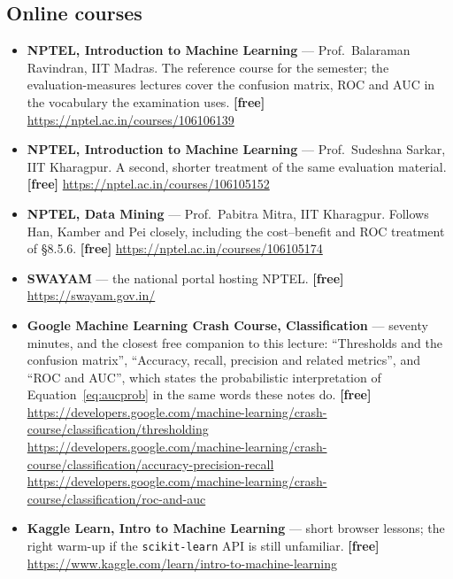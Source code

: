 \documentclass[11pt]{article}
\begin{document}
\subsection*{Online courses}

\begin{sloppypar}
\begin{itemize}[leftmargin=*]
  \item \textbf{NPTEL, Introduction to Machine Learning} --- Prof.\ Balaraman
    Ravindran, IIT Madras. The reference course for the semester; the
    evaluation-measures lectures cover the confusion matrix, ROC and AUC in the
    vocabulary the examination uses. \textbf{[free]}
    \url{https://nptel.ac.in/courses/106106139}
  \item \textbf{NPTEL, Introduction to Machine Learning} --- Prof.\ Sudeshna
    Sarkar, IIT Kharagpur. A second, shorter treatment of the same evaluation
    material. \textbf{[free]} \url{https://nptel.ac.in/courses/106105152}
  \item \textbf{NPTEL, Data Mining} --- Prof.\ Pabitra Mitra, IIT Kharagpur.
    Follows Han, Kamber and Pei closely, including the cost--benefit and ROC
    treatment of \S8.5.6. \textbf{[free]}
    \url{https://nptel.ac.in/courses/106105174}
  \item \textbf{SWAYAM} --- the national portal hosting NPTEL. \textbf{[free]}
    \url{https://swayam.gov.in/}
  \item \textbf{Google Machine Learning Crash Course, Classification} ---
    seventy minutes, and the closest free companion to this lecture:
    ``Thresholds and the confusion matrix'', ``Accuracy, recall, precision and
    related metrics'', and ``ROC and AUC'', which states the probabilistic
    interpretation of Equation~\eqref{eq:aucprob} in the same words these notes
    do. \textbf{[free]}
    \url{https://developers.google.com/machine-learning/crash-course/classification/thresholding}
    \\
    \url{https://developers.google.com/machine-learning/crash-course/classification/accuracy-precision-recall}
    \\
    \url{https://developers.google.com/machine-learning/crash-course/classification/roc-and-auc}
  \item \textbf{Kaggle Learn, Intro to Machine Learning} --- short browser
    lessons; the right warm-up if the \texttt{scikit-learn} API is still
    unfamiliar. \textbf{[free]}
    \url{https://www.kaggle.com/learn/intro-to-machine-learning}
\end{itemize}
\end{sloppypar}
\end{document}
